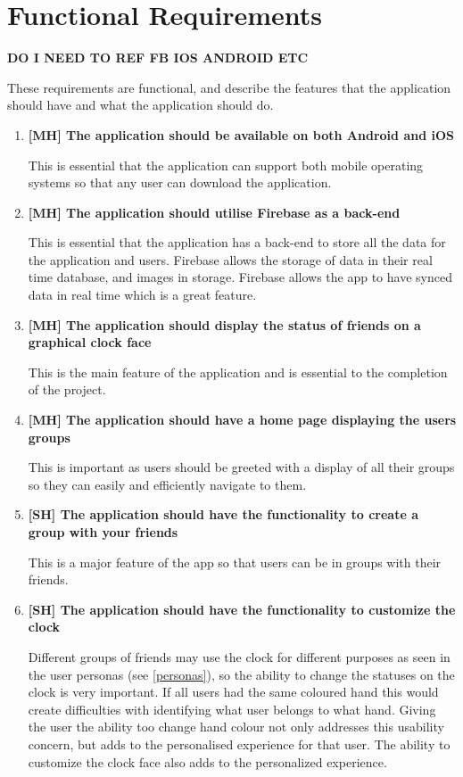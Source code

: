 \section{Functional Requirements} \label{functional}
\textbf{DO I NEED TO REF FB IOS ANDROID ETC}\par
These requirements are functional, and describe the features that the application should have and what the application should do. 
\begin{enumerate}
    \item \textbf{[MH] The application should be available on both Android and iOS} \par
    This is essential that the application can support both mobile operating systems so that any user can download the application.
    \item \textbf{[MH] The application should utilise Firebase as a back-end} \par
    This is essential that the application has a back-end to store all the data for the application and users. Firebase allows the storage of data in their real time database, and images in storage. Firebase allows the app to have synced data in real time which is a great feature.
    \item \textbf{[MH] The application should display the status of friends on a graphical clock face} \par
    This is the main feature of the application and is essential to the completion of the project.
    \item \textbf{[MH] The application should have a home page displaying the users groups} \par
    This is important as users should be greeted with a display of all their groups so they can easily and efficiently navigate to them.
    \item \textbf{[SH] The application should have the functionality to create a group with your friends} \par
    This is a major feature of the app so that users can be in groups with their friends.
    \item \textbf{[SH] The application should have the functionality to customize the clock} \par
    Different groups of friends may use the clock for different purposes as seen in the user personas (see \ref{personas}), so the ability to change the statuses on the clock is very important. If all users had the same coloured hand this would create difficulties with identifying what user belongs to what hand. Giving the user the ability too change hand colour not only addresses this usability concern, but adds to the personalised experience for that user. The ability to customize the clock face also adds to the personalized experience.

\end{enumerate}
